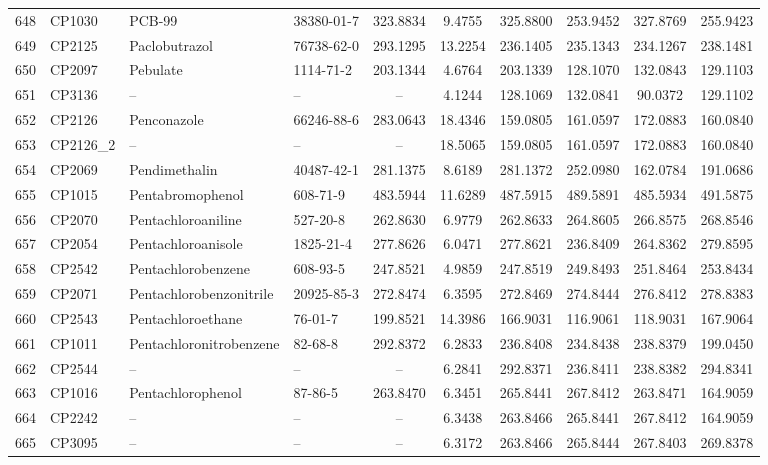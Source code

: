 \begin{longtable}{clllcccccc}
648 & CP1030 & PCB-99 & 38380-01-7 & 323.8834 & 9.4755 & 325.8800 & 253.9452 & 327.8769 & 255.9423 \\ 
649 & CP2125 & Paclobutrazol & 76738-62-0 & 293.1295 & 13.2254 & 236.1405 & 235.1343 & 234.1267 & 238.1481 \\ 
650 & CP2097 & Pebulate & 1114-71-2 & 203.1344 & 4.6764 & 203.1339 & 128.1070 & 132.0843 & 129.1103 \\ 
651 & CP3136 & – & – & – & 4.1244 & 128.1069 & 132.0841 & 90.0372 & 129.1102 \\ 
652 & CP2126 & Penconazole & 66246-88-6 & 283.0643 & 18.4346 & 159.0805 & 161.0597 & 172.0883 & 160.0840 \\ 
653 & CP2126\_2 & – & – & – & 18.5065 & 159.0805 & 161.0597 & 172.0883 & 160.0840 \\ 
654 & CP2069 & Pendimethalin & 40487-42-1 & 281.1375 & 8.6189 & 281.1372 & 252.0980 & 162.0784 & 191.0686 \\ 
655 & CP1015 & Pentabromophenol & 608-71-9 & 483.5944 & 11.6289 & 487.5915 & 489.5891 & 485.5934 & 491.5875 \\ 
656 & CP2070 & Pentachloroaniline & 527-20-8 & 262.8630 & 6.9779 & 262.8633 & 264.8605 & 266.8575 & 268.8546 \\ 
657 & CP2054 & Pentachloroanisole & 1825-21-4 & 277.8626 & 6.0471 & 277.8621 & 236.8409 & 264.8362 & 279.8595 \\ 
658 & CP2542 & Pentachlorobenzene & 608-93-5 & 247.8521 & 4.9859 & 247.8519 & 249.8493 & 251.8464 & 253.8434 \\ 
659 & CP2071 & Pentachlorobenzonitrile & 20925-85-3 & 272.8474 & 6.3595 & 272.8469 & 274.8444 & 276.8412 & 278.8383 \\ 
660 & CP2543 & Pentachloroethane & 76-01-7 & 199.8521 & 14.3986 & 166.9031 & 116.9061 & 118.9031 & 167.9064 \\ 
661 & CP1011 & Pentachloronitrobenzene & 82-68-8 & 292.8372 & 6.2833 & 236.8408 & 234.8438 & 238.8379 & 199.0450 \\ 
662 & CP2544 & – & – & – & 6.2841 & 292.8371 & 236.8411 & 238.8382 & 294.8341 \\ 
663 & CP1016 & Pentachlorophenol\smash{\textsuperscript{\textdaggerdbl}} & 87-86-5 & 263.8470 & 6.3451 & 265.8441 & 267.8412 & 263.8471 & 164.9059 \\ 
664 & CP2242 & – & – & – & 6.3438 & 263.8466 & 265.8441 & 267.8412 & 164.9059 \\ 
665 & CP3095 & – & – & – & 6.3172 & 263.8466 & 265.8444 & 267.8403 & 269.8378 \\ 

\end{longtable}
